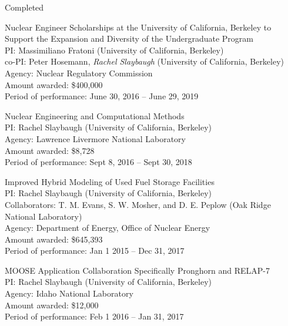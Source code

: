 \begin{rSubsection}{Completed}{}{}{}
\item Nuclear Engineer Scholarships at the University of California, Berkeley to Support the Expansion and Diversity of the Undergraduate Program	\\
PI: Massimiliano Fratoni (University of California, Berkeley) \\
\hspace*{1 em} co-PI: Peter Hosemann, \textit{Rachel Slaybaugh} (University of California, Berkeley)\\
Agency: Nuclear Regulatory Commission \\
Amount awarded: \$400,000\\
Period of performance: June 30, 2016 -- June 29, 2019
\vspace*{0.3 em}

\item Nuclear Engineering and Computational Methods\\
PI: Rachel Slaybaugh (University of California, Berkeley)\\
Agency: Lawrence Livermore National Laboratory \\
Amount awarded: \$8,728\\
Period of performance: Sept 8, 2016 -- Sept 30, 2018	

\vspace*{0.3 em}
\item Improved Hybrid Modeling of Used Fuel Storage Facilities\\
PI: Rachel Slaybaugh (University of California, Berkeley)\\
\hspace*{1 em}  Collaborators: T. M. Evans, S. W. Mosher, and D. E. Peplow (Oak Ridge National Laboratory)\\
Agency: Department of Energy, Office of Nuclear Energy \\
Amount awarded: \$645,393\\
Period of performance: Jan 1 2015 -- Dec 31, 2017

\vspace*{0.3 em}
\item MOOSE Application Collaboration Specifically Pronghorn and RELAP-7\\ 
PI: Rachel Slaybaugh (University of California, Berkeley)\\
Agency: Idaho National Laboratory \\
Amount awarded: \$12,000\\
Period of performance: Feb 1 2016 -- Jan 31, 2017


\end{rSubsection}
